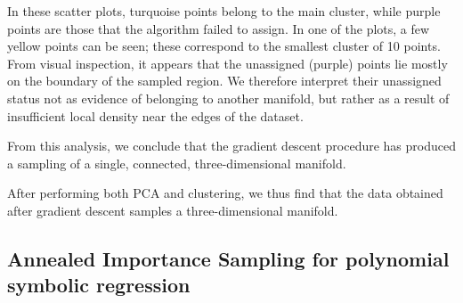 \documentclass[11pt]{article}
\begin{document}
		In these scatter plots, turquoise points belong to the main cluster, while purple points are those that the algorithm failed to assign. In one of the plots, a few yellow points can be seen; these correspond to the smallest cluster of 10 points. From visual inspection, it appears that the unassigned (purple) points lie mostly on the boundary of the sampled region. We therefore interpret their unassigned status not as evidence of belonging to another manifold, but rather as a result of insufficient local density near the edges of the dataset.
		
		From this analysis, we conclude that the gradient descent procedure has produced a sampling of a single, connected, three-dimensional manifold.
		
		\vspace{0.5em}
		
		After performing both PCA and clustering, we thus find that the data obtained after gradient descent samples a three-dimensional manifold.

	\subsection{Annealed Importance Sampling for polynomial symbolic regression}
		
\end{document}
